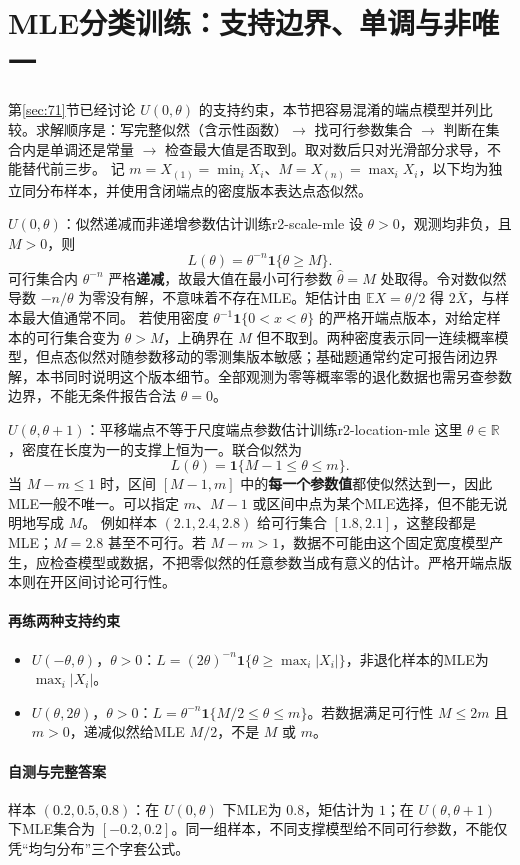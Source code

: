 \section{MLE分类训练：支持边界、单调与非唯一}\label{r2:mle}
第\ref{sec:71}节已经讨论 $U(0,\theta)$ 的支持约束，本节把容易混淆的端点模型并列比较。求解顺序是：写完整似然（含示性函数）$\to$ 找可行参数集合 $\to$ 判断在集合内是单调还是常量 $\to$ 检查最大值是否取到。取对数后只对光滑部分求导，不能替代前三步。
记 $m=X_{(1)}=\min_iX_i$、$M=X_{(n)}=\max_iX_i$，以下均为独立同分布样本，并使用含闭端点的密度版本表达点态似然。

\begin{example}{$U(0,\theta)$：似然递减而非递增}{参数估计训练}{r2-scale-mle}
设 $\theta>0$，观测均非负，且 $M>0$，则
\[
 L(\theta)=\theta^{-n}\boldsymbol1\{\theta\ge M\}.
\]
可行集合内 $\theta^{-n}$ 严格\textbf{递减}，故最大值在最小可行参数 $\hat\theta=M$ 处取得。令对数似然导数 $-n/\theta$ 为零没有解，不意味着不存在MLE。矩估计由 $\mathbb EX=\theta/2$ 得 $2\bar X$，与样本最大值通常不同。
若使用密度 $\theta^{-1}\boldsymbol1\{0<x<\theta\}$ 的严格开端点版本，对给定样本的可行集合变为 $\theta>M$，上确界在 $M$ 但不取到。两种密度表示同一连续概率模型，但点态似然对随参数移动的零测集版本敏感；基础题通常约定可报告闭边界解，本书同时说明这个版本细节。全部观测为零等概率零的退化数据也需另查参数边界，不能无条件报告合法 $\theta=0$。
\end{example}

\begin{example}{$U(\theta,\theta+1)$：平移端点不等于尺度端点}{参数估计训练}{r2-location-mle}
这里 $\theta\in\mathbb R$，密度在长度为一的支撑上恒为一。联合似然为
\[
 L(\theta)=\boldsymbol1\{M-1\le\theta\le m\}.
\]
当 $M-m\le1$ 时，区间 $[M-1,m]$ 中的\textbf{每一个参数值}都使似然达到一，因此MLE一般不唯一。可以指定 $m$、$M-1$ 或区间中点为某个MLE选择，但不能无说明地写成 $M$。
例如样本 $(2.1,2.4,2.8)$ 给可行集合 $[1.8,2.1]$，这整段都是MLE；$M=2.8$ 甚至不可行。若 $M-m>1$，数据不可能由这个固定宽度模型产生，应检查模型或数据，不把零似然的任意参数当成有意义的估计。严格开端点版本则在开区间讨论可行性。
\end{example}

\paragraph{再练两种支持约束}
\begin{itemize}
\item $U(-\theta,\theta)$，$\theta>0$：$L=(2\theta)^{-n}\boldsymbol1\{\theta\ge \max_i|X_i|\}$，非退化样本的MLE为 $\max_i|X_i|$。
\item $U(\theta,2\theta)$，$\theta>0$：$L=\theta^{-n}\boldsymbol1\{M/2\le\theta\le m\}$。若数据满足可行性 $M\le2m$ 且 $m>0$，递减似然给MLE $M/2$，不是 $M$ 或 $m$。
\end{itemize}

\paragraph{自测与完整答案}
样本 $(0.2,0.5,0.8)$：在 $U(0,\theta)$ 下MLE为 $0.8$，矩估计为 $1$；在 $U(\theta,\theta+1)$ 下MLE集合为 $[-0.2,0.2]$。同一组样本，不同支撑模型给不同可行参数，不能仅凭“均匀分布”三个字套公式。
